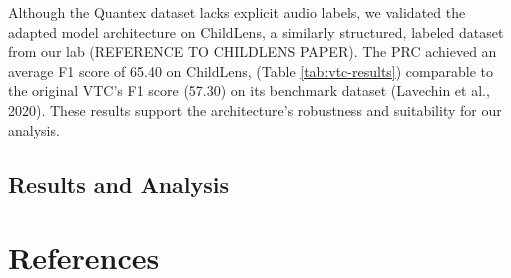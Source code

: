 \documentclass[
  man,floatsintext]{apa6}
\begin{document}
Although the Quantex dataset lacks explicit audio labels, we validated the adapted model architecture on ChildLens, a similarly structured, labeled dataset from our lab (REFERENCE TO CHILDLENS PAPER). The PRC achieved an average F1 score of 65.40 on ChildLens, (Table \ref{tab:vtc-results}) comparable to the original VTC's F1 score (57.30) on its benchmark dataset (Lavechin et al., 2020). These results support the architecture's robustness and suitability for our analysis.

\subsection{Results and Analysis}\label{sup-results}

\newpage

\section{References}\label{references-1}

\begingroup
\setlength{\parindent}{-0.5in}
\setlength{\leftskip}{0.5in}
\end{document}
